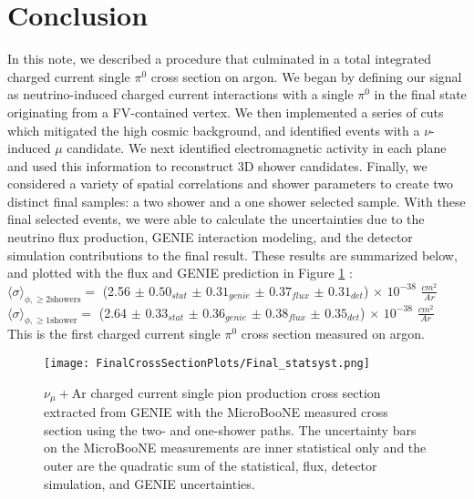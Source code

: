 \clearpage 
 \section{Conclusion}
In this note, we described a procedure that culminated in a total integrated charged current single $\pi^0$ cross section on argon. We began by defining our signal as neutrino-induced charged current interactions with a single $\pi^0$ in the final state originating from a FV-contained vertex.  We then implemented a series of cuts which mitigated the high cosmic background, and identified events with a $\nu$-induced $\mu$ candidate.  We next identified electromagnetic activity in each plane and used this information to reconstruct 3D shower candidates. Finally, we considered a variety of spatial correlations and shower parameters to create two distinct final samples: a two shower and a one shower selected sample.  With these final selected events, we were able to calculate the uncertainties due to the neutrino flux production, GENIE interaction modeling, and the detector simulation contributions to the final result.  These results are summarized below, and plotted with the flux and GENIE prediction in Figure \ref{fig:genie_uboone_xsec2} :\\

\noindent $\langle \sigma\rangle_{\phi,\geq 2 \text{showers}}=$ (2.56 $\pm$ $0.50_{stat}$ $\pm$ $0.31_{genie}$ $\pm$ $0.37_{flux}$ $\pm$ $0.31_{det}$) $\times$ $10^{-38}$ $\frac{cm^2}{Ar}$ \\

\noindent $\langle \sigma\rangle_{\phi,\geq 1 \text{shower}}=$ (2.64 $\pm$ $0.33_{stat}$ $\pm$ $0.36_{genie}$ $\pm$ $0.38_{flux}$ $\pm$ $0.35_{det}$) $\times$ $10^{-38}$ $\frac{cm^2}{Ar}$ \\

\noindent This is the first charged current single $\pi^0$ cross section measured on argon.

\begin{figure}[h!]
\centering
\texttt{[image: FinalCrossSectionPlots/Final\_statsyst.png]}
\caption{ $\nu_{\mu}+\text{Ar}$ charged current single pion production cross section extracted from GENIE with the MicroBooNE measured cross section using the two- and one-shower paths. The uncertainty bars on the MicroBooNE measurements are inner statistical only and the outer are the quadratic sum of the statistical, flux, detector simulation, and GENIE uncertainties.}
\label{fig:genie_uboone_xsec2}
\end{figure}


